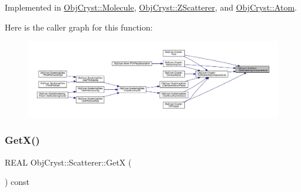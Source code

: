 Implemented in \mbox{\hyperlink{class_obj_cryst_1_1_molecule_a03f7f32ade8523f118cab14a21a87843}{Obj\+Cryst\+::\+Molecule}}, \mbox{\hyperlink{class_obj_cryst_1_1_z_scatterer_afebe0638df5f8f8cd3db05f69ed41a21}{Obj\+Cryst\+::\+Z\+Scatterer}}, and \mbox{\hyperlink{class_obj_cryst_1_1_atom_a91b7898458e7d14431ceaa380b8a2121}{Obj\+Cryst\+::\+Atom}}.

Here is the caller graph for this function\+:
\nopagebreak
\begin{figure}[H]
\begin{center}
\leavevmode
\includegraphics[width=350pt]{class_obj_cryst_1_1_scatterer_aca0e08e3793cc69d31fce53e481c2a67_icgraph}
\end{center}
\end{figure}
\mbox{\label{class_obj_cryst_1_1_scatterer_aa46e022b2ea81079b4d02da07b6bec4a}} 
\subsubsection{\texorpdfstring{GetX()}{GetX()}}
{\footnotesize\ttfamily R\+E\+AL Obj\+Cryst\+::\+Scatterer\+::\+GetX (\begin{DoxyParamCaption}{ }\end{DoxyParamCaption}) const}

